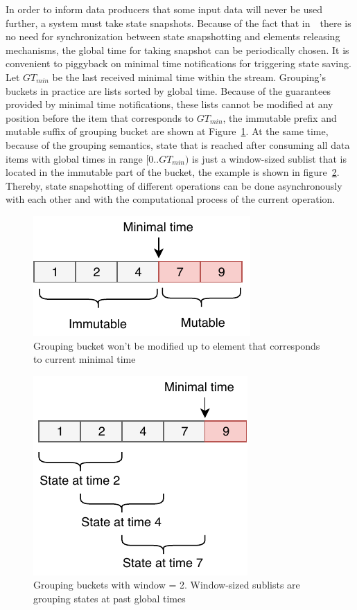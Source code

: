 In order to inform data producers that some input data will never be used further, a system must take state snapshots. Because of the fact that in~\FlameStream\ there is no need for synchronization between state snapshotting and elements releasing mechanisms, the global time for taking snapshot can be periodically chosen. It is convenient to piggyback on minimal time notifications for triggering state saving. Let $GT_{min}$ be the last received minimal time within the stream. Grouping's buckets in practice are lists sorted by global time. Because of the guarantees provided by minimal time notifications, these lists cannot be modified at any position before the item that corresponds to $GT_{min}$, the immutable prefix and mutable suffix of grouping bucket are shown at Figure~\ref{immutable}. At the same time, because of the grouping semantics, state that is reached after consuming all data items with global times in range $[0..GT_{min})$ is just a window-sized sublist that is located in the immutable part of the bucket, the example is shown in figure~\ref{substate}. Thereby, state snapshotting of different operations can be done asynchronously with each other and with the computational process of the current operation. 

\begin{figure}[htbp]
  \centering
  \includegraphics[width=.3\textwidth]{pics/immutable}
  \caption{Grouping bucket won't be modified up to element that corresponds to current minimal time}
  \label {immutable}
\end{figure}

\begin{figure}[htbp]
  \centering
  \includegraphics[width=.3\textwidth]{pics/substate}
  \caption{Grouping buckets with window = 2. Window-sized sublists are grouping states at past global times}
  \label {substate}
\end{figure}

